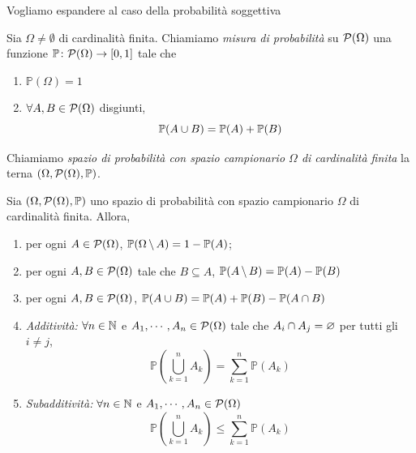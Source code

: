 \documentclass[a4paper]{article}
\begin{document}
Vogliamo espandere al caso della probabilità soggettiva
\begin{snippetdefinition}{}
    Sia \(\Omega \neq \emptyset\) di cardinalità finita.
    Chiamiamo \emph{misura di probabilità} su \(\mathcal P(\Omega)\)
    una funzione \(\mathbb P \colon \mathcal P(\Omega) \to [0,1]\)
    tale che
    \begin{enumerate}
        \item \(\mathbb P(\Omega) = 1\)
        \item \(\forall A, B \in \mathcal P(\Omega)\) disgiunti,
            \[  \mathbb P (A \cup B) = \mathbb P (A) + \mathbb P (B) \]
    \end{enumerate}
    Chiamiamo \emph{spazio di probabilità con spazio campionario \(\Omega\)
    di cardinalità finita} la terna \((\Omega, \mathcal P(\Omega), \mathbb P)\).
\end{snippetdefinition}

\begin{snippetproposition}{}
    Sia \((\Omega, \mathcal P(\Omega), \mathbb P)\)
    uno spazio di probabilità con spazio campionario \(\Omega\)
    di cardinalità finita. Allora,
    \begin{enumerate}
        \item per ogni \(A \in \mathcal P(\Omega)\), \(\mathbb P(\Omega \,\backslash\, A) = 1 - \mathbb P (A)\);
        \item per ogni \(A,B \in \mathcal P(\Omega)\) tale che \(B \subseteq A\),
            \(\mathbb P(A \,\backslash\, B) = \mathbb P (A) - \mathbb P (B)\)
        \item per ogni \(A,B \in \mathcal P(\Omega)\), \(\mathbb P (A \cup B) = \mathbb P (A) + \mathbb P (B) - \mathbb P (A \cap B)\)
        \item \emph{Additività:} \(\forall n \in \mathbb{N}\) e \(A_1, \cdots, A_n \in \mathcal P(\Omega)\) tale che
            \(A_i \cap A_j = \varnothing\) per tutti gli \(i \neq j\),
            \[
                \mathbb P \left(
                    \bigcup_{k=1}^n A_k
                \right) = \sum_{k=1}^n \mathbb P(A_k)
            \]
        \item \emph{Subadditività:} \(\forall n \in \mathbb{N}\) e \(A_1, \cdots, A_n \in \mathcal P(\Omega)\)
            \[
                \mathbb P \left(\bigcup_{k=1}^n A_k\right) \leq \sum_{k=1}^n \mathbb P(A_k)
            \]
    \end{enumerate}
\end{snippetproposition}
\end{document}
